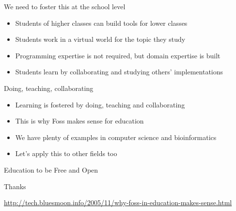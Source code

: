 \documentclass{beamer}
\begin{document}
\begin{frame}{We need to foster this at the school level}
   \begin{itemize}
   \item Students of higher classes can build tools for lower classes
   \item Students work in a virtual world for the topic they study
   \item Programming expertise is not required, but domain expertise is built
   \item Students learn by collaborating and studying others' implementations
   \end{itemize}
\end{frame}

\begin{frame}{Doing, teaching, collaborating}
   \begin{itemize}
   \item Learning is fostered by doing, teaching and collaborating
   \item This is why Foss makes sense for education
   \item We have plenty of examples in computer science and bioinformatics
   \item Let's apply this to other fields too
   \end{itemize}
\end{frame}

\begin{frame}
   \begin{block}{}
   \begin{center}
   Education  to be Free and Open
   \end{center}
   \end{block}
\end{frame}

\begin{frame}{Thanks}
   \begin{center}
   \small{\href{http://tech.bluesmoon.info/2005/11/why-foss-in-education-makes-sense.html}{http://tech.bluesmoon.info/2005/11/why-foss-in-education-makes-sense.html}}
   \end{center}
\end{frame}
\end{document}
